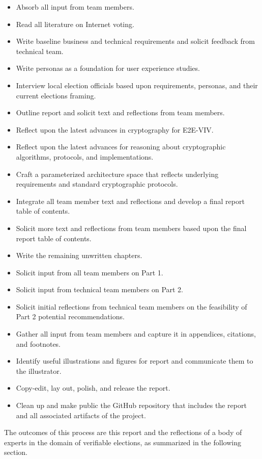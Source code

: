 \begin{itemize}
\item Absorb all input from team members.
\item Read all literature on Internet voting.
\item Write baseline business and technical requirements and solicit
  feedback from technical team.
\item Write personas as a foundation for user experience studies.
\item Interview local election officials based upon requirements,
  personas, and their current elections framing.
\item Outline report and solicit text and reflections from team members.
\item Reflect upon the latest advances in cryptography for E2E-VIV.
\item Reflect upon the latest advances for reasoning about
  cryptographic algorithms, protocols, and implementations.
\item Craft a parameterized architecture space that reflects
  underlying requirements and standard cryptographic protocols.
\item Integrate all team member text and reflections and develop a
  final report table of contents.
\item Solicit more text and reflections from team members based upon
  the final report table of contents.
\item Write the remaining unwritten chapters.
\item Solicit input from all team members on Part 1.
\item Solicit input from technical team members on Part 2.
\item Solicit initial reflections from technical team members on the
  feasibility of Part 2 potential recommendations.
\item Gather all input from team members and capture it in appendices,
  citations, and footnotes.
\item Identify useful illustrations and figures for report and
  communicate them to the illustrator.
\item Copy-edit, lay out, polish, and release the report.
\item Clean up and make public the GitHub repository that includes the
  report and all associated artifacts of the project.
\end{itemize}

The outcomes of this process are this report and the reflections of a
body of experts in the domain of verifiable elections, as summarized
in the following section.

